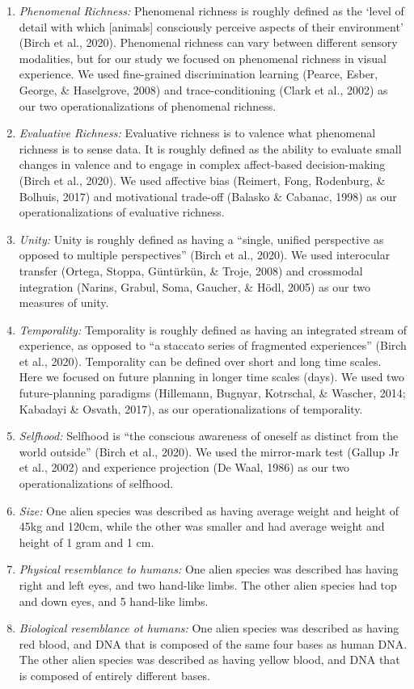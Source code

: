 \documentclass[10pt, letterpaper]{article}
\begin{document}
\begin{enumerate}
\def\labelenumi{\arabic{enumi}.}
\item
  \emph{Phenomenal Richness:} Phenomenal richness is roughly defined as
  the `level of detail with which {[}animals{]} consciously perceive
  aspects of their environment' (Birch et al., 2020). Phenomenal
  richness can vary between different sensory modalities, but for our
  study we focused on phenomenal richness in visual experience. We used
  fine-grained discrimination learning (Pearce, Esber, George, \&
  Haselgrove, 2008) and trace-conditioning (Clark et al., 2002) as our
  two operationalizations of phenomenal richness.
\item
  \emph{Evaluative Richness:} Evaluative richness is to valence what
  phenomenal richness is to sense data. It is roughly defined as the
  ability to evaluate small changes in valence and to engage in complex
  affect-based decision-making (Birch et al., 2020). We used affective
  bias (Reimert, Fong, Rodenburg, \& Bolhuis, 2017) and motivational
  trade-off (Balasko \& Cabanac, 1998) as our operationalizations of
  evaluative richness.
\item
  \emph{Unity:} Unity is roughly defined as having a ``single, unified
  perspective as opposed to multiple perspectives'' (Birch et al.,
  2020). We used interocular transfer (Ortega, Stoppa, Güntürkün, \&
  Troje, 2008) and crossmodal integration (Narins, Grabul, Soma,
  Gaucher, \& Hödl, 2005) as our two measures of unity.
\item
  \emph{Temporality:} Temporality is roughly defined as having an
  integrated stream of experience, as opposed to ``a staccato series of
  fragmented experiences'' (Birch et al., 2020). Temporality can be
  defined over short and long time scales. Here we focused on future
  planning in longer time scales (days). We used two future-planning
  paradigms (Hillemann, Bugnyar, Kotrschal, \& Wascher, 2014; Kabadayi
  \& Osvath, 2017), as our operationalizations of temporality.
\item
  \emph{Selfhood:} Selfhood is ``the conscious awareness of oneself as
  distinct from the world outside'' (Birch et al., 2020). We used the
  mirror-mark test (Gallup Jr et al., 2002) and experience projection
  (De Waal, 1986) as our two operationalizations of selfhood.
\item
  \emph{Size:} One alien species was described as having average weight
  and height of 45kg and 120cm, while the other was smaller and had
  average weight and height of 1 gram and 1 cm.
\item
  \emph{Physical resemblance to humans:} One alien species was described
  has having right and left eyes, and two hand-like limbs. The other
  alien species had top and down eyes, and 5 hand-like limbs.
\item
  \emph{Biological resemblance ot humans:} One alien species was
  described as having red blood, and DNA that is composed of the same
  four bases as human DNA. The other alien species was described as
  having yellow blood, and DNA that is composed of entirely different
  bases.
\end{enumerate}
\end{document}
